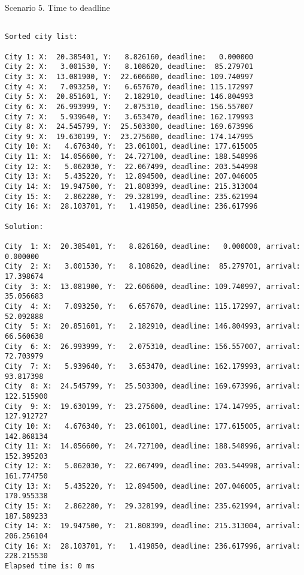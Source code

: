 \documentclass[a4paper, 12pt]{article}
\begin{document}
Scenario 5. Time to deadline

\begin{lstlisting}

Sorted city list:

City 1: X:  20.385401, Y:   8.826160, deadline:   0.000000
City 2: X:   3.001530, Y:   8.108620, deadline:  85.279701
City 3: X:  13.081900, Y:  22.606600, deadline: 109.740997
City 4: X:   7.093250, Y:   6.657670, deadline: 115.172997
City 5: X:  20.851601, Y:   2.182910, deadline: 146.804993
City 6: X:  26.993999, Y:   2.075310, deadline: 156.557007
City 7: X:   5.939640, Y:   3.653470, deadline: 162.179993
City 8: X:  24.545799, Y:  25.503300, deadline: 169.673996
City 9: X:  19.630199, Y:  23.275600, deadline: 174.147995
City 10: X:   4.676340, Y:  23.061001, deadline: 177.615005
City 11: X:  14.056600, Y:  24.727100, deadline: 188.548996
City 12: X:   5.062030, Y:  22.067499, deadline: 203.544998
City 13: X:   5.435220, Y:  12.894500, deadline: 207.046005
City 14: X:  19.947500, Y:  21.808399, deadline: 215.313004
City 15: X:   2.862280, Y:  29.328199, deadline: 235.621994
City 16: X:  28.103701, Y:   1.419850, deadline: 236.617996

Solution: 

City  1: X:  20.385401, Y:   8.826160, deadline:   0.000000, arrival:   0.000000
City  2: X:   3.001530, Y:   8.108620, deadline:  85.279701, arrival:  17.398674
City  3: X:  13.081900, Y:  22.606600, deadline: 109.740997, arrival:  35.056683
City  4: X:   7.093250, Y:   6.657670, deadline: 115.172997, arrival:  52.092888
City  5: X:  20.851601, Y:   2.182910, deadline: 146.804993, arrival:  66.560638
City  6: X:  26.993999, Y:   2.075310, deadline: 156.557007, arrival:  72.703979
City  7: X:   5.939640, Y:   3.653470, deadline: 162.179993, arrival:  93.817398
City  8: X:  24.545799, Y:  25.503300, deadline: 169.673996, arrival: 122.515900
City  9: X:  19.630199, Y:  23.275600, deadline: 174.147995, arrival: 127.912727
City 10: X:   4.676340, Y:  23.061001, deadline: 177.615005, arrival: 142.868134
City 11: X:  14.056600, Y:  24.727100, deadline: 188.548996, arrival: 152.395203
City 12: X:   5.062030, Y:  22.067499, deadline: 203.544998, arrival: 161.774750
City 13: X:   5.435220, Y:  12.894500, deadline: 207.046005, arrival: 170.955338
City 15: X:   2.862280, Y:  29.328199, deadline: 235.621994, arrival: 187.589233
City 14: X:  19.947500, Y:  21.808399, deadline: 215.313004, arrival: 206.256104
City 16: X:  28.103701, Y:   1.419850, deadline: 236.617996, arrival: 228.215530
Elapsed time is: 0 ms

\end{lstlisting}
\end{document}
